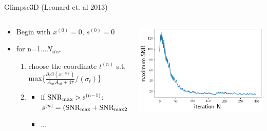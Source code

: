 \documentclass[10pt]{beamer}
\begin{document}
\begin{frame}{Glimpse3D (Leonard et. al 2013)}

\begin{columns}
\begin{column}{0.5\textwidth}
\begin{itemize}
\item Begin with $x^{(0)}=0$, $s^{(0)}=0$
 \item for n=1...$N_{iter}$
    \begin{enumerate}
     \item choose the coordinate $t^{(n)}$ s.t. max\{$\frac{\partial_t G(x^{(n)})}{A_{\alpha t}A_{\alpha t}+4\tau}/(\sigma_t)$\}
     \item \begin{itemize}
            \item if $\rm{SNR_{max}}>s^{(n-1)}$: $s^{(n)}=(\rm{SNR_{max}}+\rm{SNR_{max2})/2}$
            \item ...
           \end{itemize}

    \end{enumerate}
\end{itemize}
\end{column}
\begin{column}{0.5\textwidth}
\includegraphics[height=.75\textwidth]{./tau20spect-maxSNR-z2-m8.png}
\end{column}
\end{columns}
\end{frame}
\end{document}
